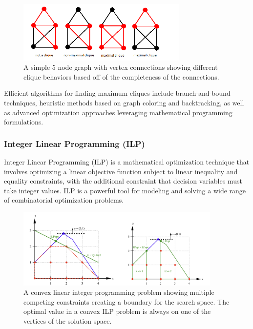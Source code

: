 \documentclass[11pt]{report}
\begin{document}
        \begin{figure}[h!]
            \centering
            \includegraphics[width=0.75\textwidth,keepaspectratio]{Images/clique.png}
            \caption{A simple 5 node graph with vertex connections showing different clique behaviors based off of the completeness of the connections.}
            \label{fig:clique-demo}
        \end{figure}
        
        Efficient algorithms for finding maximum cliques include branch-and-bound techniques, heuristic methods based on graph coloring and backtracking, as well as advanced optimization approaches leveraging mathematical programming formulations.

        \subsubsection{Integer Linear Programming (ILP)}
        Integer Linear Programming (ILP) is a mathematical optimization technique that involves optimizing a linear objective function subject to linear inequality and equality constraints, with the additional constraint that decision variables must take integer values. ILP is a powerful tool for modeling and solving a wide range of combinatorial optimization problems.

        \begin{figure}[h!]
            \centering
            \includegraphics[width=0.9\textwidth,keepaspectratio]{Images/integer-linear.png}
            \caption{A convex linear integer programming problem showing multiple competing constraints creating a boundary for the search space. The optimal value in a convex ILP problem is always on one of the vertices of the solution space.}
            \label{fig:ilp-demo}
        \end{figure}
\end{document}
